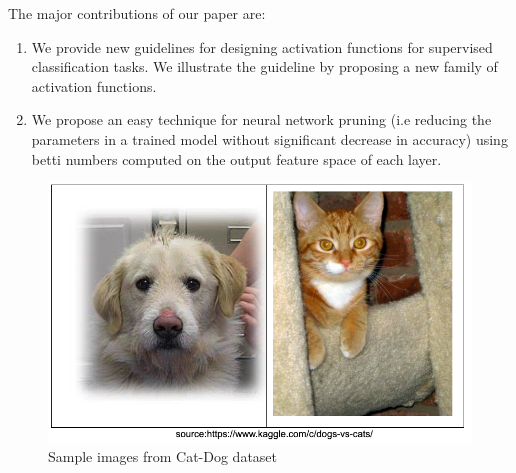 \documentclass{bmvc2k}
\begin{document}
The major contributions of our paper are:
\begin{enumerate}
\item We provide new guidelines for designing  activation functions for supervised classification tasks. We illustrate the guideline by proposing a  new family of activation functions.
\item We propose an easy technique for neural network pruning (i.e reducing the parameters in a trained model without significant decrease in accuracy) using betti numbers computed on the output feature space of each layer.
\end{enumerate}

\begin{figure}[!t]
\centering
  \includegraphics[width=.5\linewidth]{DogCat/catdog.png}
\vspace{0.1in}
    \caption{Sample images from Cat-Dog dataset}
    \label{catdog}
\end{figure}
\end{document}
